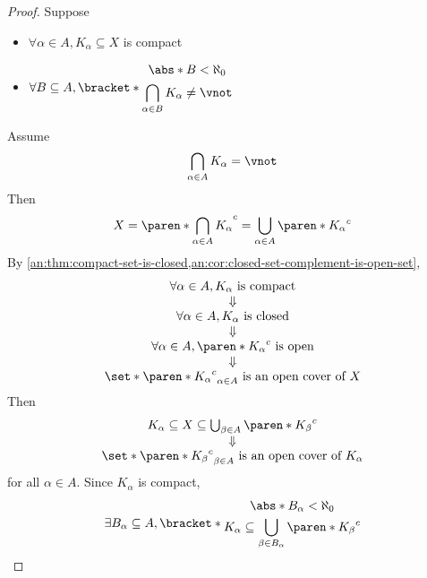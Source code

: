 \begin{proof}
  Suppose
  \begin{itemize}
    \item $\forall \alpha \in A, K_{\alpha} \subseteq X$ is compact
    \item $\forall B \subseteq A,
            \bracket*{\begin{gathered}
                \abs*{B} < \aleph_{0} \\
                \bigcap_{\alpha \in B} K_{\alpha} \neq \vnot
              \end{gathered}}$
  \end{itemize}
  Assume
  \[
    \bigcap_{\alpha \in A} K_{\alpha} = \vnot
  \]
  Then
  \[
    X = \paren*{\bigcap_{\alpha \in A} K_{\alpha}}^{c} = \bigcup_{\alpha \in A} \paren*{K_{\alpha}}^{c}
  \]
  By \cref{an:thm:compact-set-is-closed,an:cor:closed-set-complement-is-open-set},
  \[
    \begin{array}{c}
      \forall \alpha \in A, K_{\alpha} \text{ is compact}           \\
      \Downarrow                                                    \\
      \forall \alpha \in A, K_{\alpha} \text{ is closed}            \\
      \Downarrow                                                    \\
      \forall \alpha \in A, \paren*{K_{\alpha}}^{c} \text{ is open} \\
      \Downarrow                                                    \\
      \set*{\paren*{K_{\alpha}}^{c}}_{\alpha \in A} \text{ is an open cover of } X
    \end{array}
  \]
  Then
  \[
    \begin{array}{c}
      K_{\alpha} \subseteq X \subseteq \bigcup_{\beta \in A} \paren*{K_{\beta}}^{c} \\
      \Downarrow                                                                    \\
      \set*{\paren*{K_{\beta}}^{c}}_{\beta \in A} \text{ is an open cover of } K_{\alpha}
    \end{array}
  \]
  for all $\alpha \in A$. Since $K_{\alpha}$ is compact,
  \[
    \begin{array}{c}
      \exists B_{\alpha} \subseteq A,
      \bracket*{\begin{gathered}
          \abs*{B_{\alpha}} < \aleph_{0} \\
          K_{\alpha} \subseteq \bigcup_{\beta \in B_{\alpha}} \paren*{K_{\beta}}^{c}

\end{gathered}}
\end{array}\]
\end{proof}
